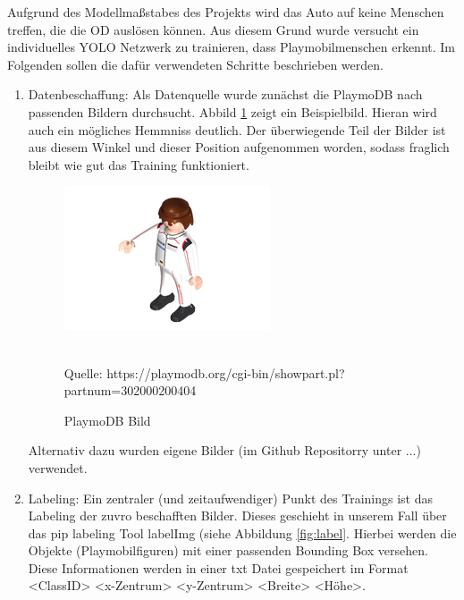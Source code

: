 Aufgrund des Modellmaßstabes des Projekts wird das Auto auf keine Menschen treffen, die die \ac{OD} auslösen können.
Aus diesem Grund wurde versucht ein individuelles \ac{YOLO} Netzwerk zu trainieren, dass Playmobilmenschen erkennt. Im Folgenden sollen die dafür verwendeten Schritte beschrieben werden.
\begin{enumerate}
    \item Datenbeschaffung:
    Als Datenquelle wurde zunächst die PlaymoDB \cite{PlaymoDB.2020} nach passenden Bildern durchsucht. Abbild \ref{fig:playmo} zeigt ein Beispielbild. Hieran wird auch ein mögliches Hemmniss deutlich. Der überwiegende Teil der Bilder ist aus diesem Winkel und dieser Position aufgenommen worden, sodass fraglich bleibt wie gut das Training funktioniert.
    
    \begin{figure}[H]
        \centering
        \includegraphics[scale=0.5]{./img/playmo.jpg}
        \caption{PlaymoDB Bild}
        \label{fig:playmo}
        \\ Quelle: https://playmodb.org/cgi-bin/showpart.pl?partnum=302000200404
    \end{figure}
    
    Alternativ dazu wurden eigene Bilder (im Github Repositorry unter ...) verwendet.
    \item Labeling:
    Ein zentraler (und zeitaufwendiger) Punkt des Trainings ist das Labeling der zuvro beschafften Bilder. Dieses geschieht in unserem Fall über das pip labeling Tool labelImg (siehe Abbildung \ref{fig:label}. Hierbei werden die Objekte (Playmobilfiguren) mit einer passenden Bounding Box versehen. Diese Informationen werden in einer txt Datei gespeichert im Format <ClassID> <x-Zentrum> <y-Zentrum> <Breite> <Höhe>.
    

\end{enumerate}
